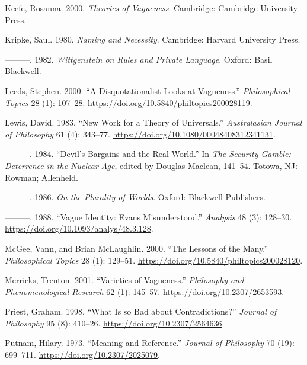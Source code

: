 \documentclass[
  11pt,
  letterpaper,
  DIV=11,
  numbers=noendperiod,
  oneside]{scrartcl}
\newlength{\cslhangindent}
\newenvironment{CSLReferences}[2] %
 {\begin{list}{}{%
  \setlength{\itemindent}{0pt}
  \setlength{\leftmargin}{0pt}
  \setlength{\parsep}{0pt}
  \ifodd #1
   \setlength{\leftmargin}{\cslhangindent}
   \setlength{\itemindent}{-1\cslhangindent}
  \fi
  \setlength{\itemsep}{#2\baselineskip}}}
 {\end{list}}
\begin{document}
\begin{CSLReferences}{1}{0}
Keefe, Rosanna. 2000. \emph{Theories of Vagueness}. Cambridge: Cambridge
University Press.

Kripke, Saul. 1980. \emph{Naming and Necessity}. Cambridge: Harvard
University Press.

---------. 1982. \emph{Wittgenstein on Rules and Private Language}.
Oxford: Basil Blackwell.

Leeds, Stephen. 2000. {``A Disquotationalist Looks at Vagueness.''}
\emph{Philosophical Topics} 28 (1): 107--28.
\url{https://doi.org/10.5840/philtopics200028119}.

Lewis, David. 1983. {``New Work for a Theory of Universals.''}
\emph{Australasian Journal of Philosophy} 61 (4): 343--77.
\url{https://doi.org/10.1080/00048408312341131}.

---------. 1984. {``Devil's Bargains and the Real World.''} In \emph{The
Security Gamble: Deterrence in the Nuclear Age}, edited by Douglas
Maclean, 141--54. Totowa, NJ: Rowman; Allenheld.

---------. 1986. \emph{On the Plurality of Worlds}. Oxford: Blackwell
Publishers.

---------. 1988. {``Vague Identity: Evans Misunderstood.''}
\emph{Analysis} 48 (3): 128--30.
\url{https://doi.org/10.1093/analys/48.3.128}.

McGee, Vann, and Brian McLaughlin. 2000. {``The Lessons of the Many.''}
\emph{Philosophical Topics} 28 (1): 129--51.
\url{https://doi.org/10.5840/philtopics200028120}.

Merricks, Trenton. 2001. {``Varieties of Vagueness.''} \emph{Philosophy
and Phenomenological Research} 62 (1): 145--57.
\url{https://doi.org/10.2307/2653593}.

Priest, Graham. 1998. {``What Is so Bad about Contradictions?''}
\emph{Journal of Philosophy} 95 (8): 410--26.
\url{https://doi.org/10.2307/2564636}.

Putnam, Hilary. 1973. {``Meaning and Reference.''} \emph{Journal of
Philosophy} 70 (19): 699--711. \url{https://doi.org/10.2307/2025079}.


\end{CSLReferences}
\end{document}
